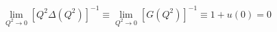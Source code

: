 \begin{equation}
 \lim_{Q^2 \rightarrow 0} [Q^2 \Delta(Q^2)]^{-1} 
\equiv  \lim_{Q^2 \rightarrow 0} [G(Q^2)]^{-1}
\equiv 1+u(0) = 0
\label{KO}
\end{equation}

